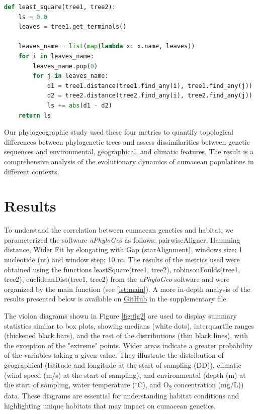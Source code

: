 \begin{lstlisting}[label=lst:LeastSquare, language=Python, caption=Python script for calculating the Least-Square distance using the ete3 package in the aPhyloGeo package]
def least_square(tree1, tree2):
    ls = 0.0
    leaves = tree1.get_terminals()

    leaves_name = list(map(lambda x: x.name, leaves))
    for i in leaves_name:
        leaves_name.pop(0)
        for j in leaves_name:
            d1 = tree1.distance(tree1.find_any(i), tree1.find_any(j))
            d2 = tree2.distance(tree2.find_any(i), tree2.find_any(j))
            ls += abs(d1 - d2)
    return ls
\end{lstlisting}

Our phylogeographic study used these four metrics to quantify topological differences between phylogenetic trees and assess dissimilarities between genetic sequences and environmental, geographical, and climatic features. The result is a comprehensive analysis of the evolutionary dynamics of cumacean populations in different contexts.

\section{Results}\label{results}

To understand the correlation between cumacean genetics and habitat, we parameterized the software \textit{aPhyloGeo} as follows: pairwiseAligner, Hamming distance, Wider Fit by elongating with Gap (starAlignment), windows size: 1 nucleotide (nt) and window step: 10 nt. The results of the metrics used were obtained using the functions leastSquare(tree1, tree2), robinsonFoulds(tree1, tree2), euclideanDist(tree1, tree2) from the \textit{aPhyloGeo} software and were organized by the main function (see \autoref{lst:main}). A more in-depth analysis of the results presented below is available on \href{https://github.com/tahiri-lab/Cumacea_aPhyloGeo}{GitHub} in the supplementary file.

The violon diagrams shown in Figure \ref{fig:fig2} are used to display summary statistics similar to box plots, showing medians (white dots), interquartile ranges (thickened black bars), and the rest of the distributions (thin black lines), with the exception of the "extreme" points. Wider areas indicate a greater probability of the variables taking a given value. They illustrate the distribution of geographical (latitude and longitude at the start of sampling (DD)), climatic (wind speed (m/s) at the start of sampling), and environmental (depth (m) at the start of sampling, water temperature ($^\circ$C), and O\textsubscript{2} concentration (mg/L)) data. These diagrams are essential for understanding habitat conditions and highlighting unique habitats that may impact on cumacean genetics. 

